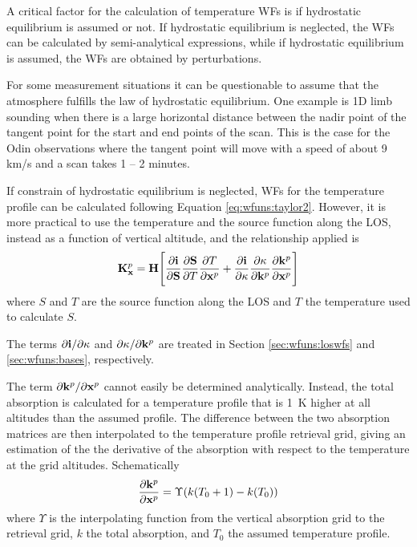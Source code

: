  \label{sec:wfuns:temp}
 
 A critical factor for the calculation of temperature WFs is if
 hydrostatic equilibrium is assumed or not. If hydrostatic equilibrium
 is neglected, the WFs can be calculated by semi-analytical
 expressions, while if hydrostatic equilibrium is assumed, the WFs are
 obtained by perturbations.

 
 For some measurement situations it can be questionable to assume that
 the atmosphere fulfills the law of hydrostatic equilibrium. One
 example is 1D limb sounding when there is a large horizontal distance
 between the nadir point of the tangent point for the start and end
 points of the scan. This is the case for the Odin observations where
 the tangent point will move with a speed of about 9 km/s and a scan
 takes 1 -- 2 minutes.
 
 If constrain of hydrostatic equilibrium is neglected, WFs for the
 temperature profile can be calculated following Equation
 \ref{eq:wfuns:taylor2}. However, it is more practical to use the
 temperature and the source function along the LOS, instead as a function
 of vertical altitude, and the relationship applied is
 \begin{equation}
    \mathbf{K}_{\mathbf{x}}^p = \mathbf{H} \Bigg[ \frac{\partial\mathbf{i}}{\partial \mathbf{S}}
                 \frac{\partial \mathbf{S}}{\partial T}
                 \frac{\partial T}{\partial \mathbf{x}^p} +
                 \frac{\partial\mathbf{i}}{\partial \kappa}
                 \frac{\partial \kappa}{\partial \mathbf{k}^p}
                 \frac{\partial \mathbf{k}^p}{\partial \mathbf{x}^p} \Bigg]
 \end{equation}
 where $S$ and $T$ are the source function along the LOS and $T$ the
 temperature used to calculate $S$.
 
 The terms $\partial \mathbf{i}/\partial \kappa$ and $\partial
 \kappa/\partial \mathbf{k}^p$ are treated in Section
 \ref{sec:wfuns:loswfs} and \ref{sec:wfuns:bases}, respectively.
 
 The term $\partial \mathbf{k}^p/\partial \mathbf{x}^p$ cannot easily be
 determined analytically. Instead, the total absorption is calculated
 for a temperature profile that is 1~K higher at all altitudes than
 the assumed profile. The difference between the two absorption
 matrices are then interpolated to the temperature profile retrieval
 grid, giving an estimation of the the derivative of the absorption
 with respect to the temperature at the grid altitudes. Schematically
 \begin{eqnarray}
   \frac{\partial \mathbf{k}^p}{\partial \mathbf{x}^p} = \Upsilon(k(T_0+1)-k(T_0))
     \nonumber
 \end{eqnarray}
 where $\Upsilon$ is the interpolating function from the vertical
 absorption grid to the retrieval grid, $k$ the total absorption, and
 $T_0$ the assumed temperature profile.
 
